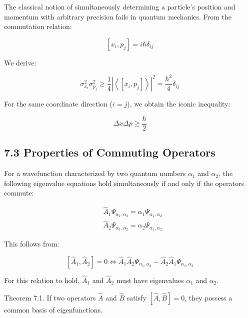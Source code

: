 \documentclass[10pt]{article}
\begin{document}
The classical notion of simultaneously determining a particle's position and momentum with arbitrary precision fails in quantum mechanics. From the commutation relation:

\begin{equation*}
\left[x_{i}, p_{j}\right]=i \hbar \delta_{i j} \tag{7.18}
\end{equation*}

We derive:

\begin{equation*}
\sigma_{x_{i}}^{2} \sigma_{p_{j}}^{2} \geq \frac{1}{4}\left|\left\langle\left[x_{i}, p_{j}\right]\right\rangle\right|^{2}=\frac{\hbar^{2}}{4} \delta_{i j} \tag{7.19}
\end{equation*}

For the same coordinate direction ($i=j$), we obtain the iconic inequality:

\begin{equation*}
\Delta x \Delta p \geq \frac{\hbar}{2} \tag{7.20}
\end{equation*}

\subsection*{7.3 Properties of Commuting Operators}
For a wavefunction characterized by two quantum numbers $\alpha_1$ and $\alpha_2$, the following eigenvalue equations hold simultaneously if and only if the operators commute:

\begin{align*}
& \hat{A}_{1} \Psi_{\alpha_{1}, \alpha_{2}}=\alpha_{1} \Psi_{\alpha_{1}, \alpha_{2}} \\
& \hat{A}_{2} \Psi_{\alpha_{1}, \alpha_{2}}=\alpha_{2} \Psi_{\alpha_{1}, \alpha_{2}} \tag{7.21}
\end{align*}

This follows from:

\begin{equation*}
\left[\hat{A}_{1}, \hat{A}_{2}\right]=0 \Longleftrightarrow \hat{A}_{1} \hat{A}_{2} \Psi_{\alpha_{1}, \alpha_{2}}-\hat{A}_{2} \hat{A}_{1} \Psi_{\alpha_{1}, \alpha_{2}} \tag{7.22}
\end{equation*}

For this relation to hold, $\hat{A}_1$ and $\hat{A}_2$ must have eigenvalues $\alpha_1$ and $\alpha_2$.

Theorem 7.1. If two operators $\hat{A}$ and $\hat{B}$ satisfy $[\hat{A}, \hat{B}]=0$, they possess a common basis of eigenfunctions.
\end{document}
